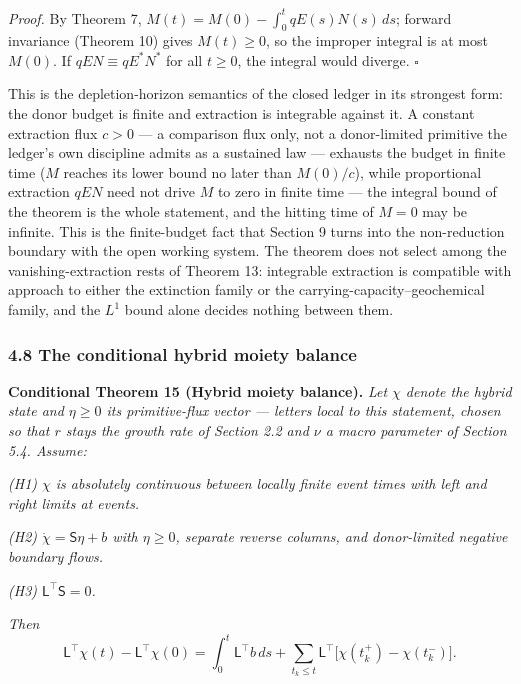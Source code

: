 \documentclass[11pt]{article}
\begin{document}
\emph{Proof.} By Theorem 7, \(M(t) = M(0) - \int_0^t qE(s)N(s)\, ds\);
forward invariance (Theorem 10) gives \(M(t) \ge 0\), so the improper
integral is at most \(M(0)\). If \(qEN \equiv qE^*N^*\) for all
\(t \ge 0\), the integral would diverge. \ensuremath{\square}

This is the depletion-horizon semantics of the closed ledger in its
strongest form: the donor budget is finite and extraction is integrable
against it. A constant extraction flux \(c > 0\) --- a comparison flux
only, not a donor-limited primitive the ledger's own discipline admits
as a sustained law --- exhausts the budget in finite time (\(M\) reaches
its lower bound no later than \(M(0)/c\)), while proportional extraction
\(qEN\) need not drive \(M\) to zero in finite time --- the integral
bound of the theorem is the whole statement, and the hitting time of
\(M = 0\) may be infinite. This is the finite-budget fact that Section 9
turns into the non-reduction boundary with the open working system. The
theorem does not select among the vanishing-extraction rests of Theorem
13: integrable extraction is compatible with approach to either the
extinction family or the carrying-capacity--geochemical family, and the
\(L^1\) bound alone decides nothing between them.

\subsubsection{4.8 The conditional hybrid moiety
balance}\label{the-conditional-hybrid-moiety-balance}

\textbf{Conditional Theorem 15 (Hybrid moiety balance).} \emph{Let
\(\chi\) denote the hybrid state and \(\eta \ge 0\) its primitive-flux
vector --- letters local to this statement, chosen so that \(r\) stays
the growth rate of Section 2.2 and \(\nu\) a macro parameter of Section
5.4. Assume:}

\emph{(H1) \(\chi\) is absolutely continuous between locally finite
event times with left and right limits at events.}

\emph{(H2) \(\dot \chi = \mathsf{S}\eta + b\) with \(\eta \ge 0\),
separate reverse columns, and donor-limited negative boundary flows.}

\emph{(H3) \(\mathsf{L}^\top \mathsf{S} = 0\).}

\emph{Then}
\[\mathsf{L}^\top \chi(t) - \mathsf{L}^\top \chi(0) = \int_0^t \mathsf{L}^\top b\, ds + \sum_{t_k \le t} \mathsf{L}^\top \bigl[ \chi(t_k^+) - \chi(t_k^-) \bigr].\]
\end{document}
